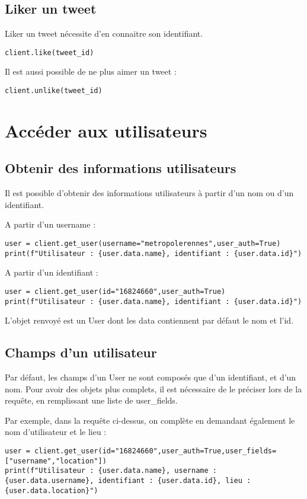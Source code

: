 \documentclass[11pt,a4paper]{article}
\begin{document}
\subsection{Liker un tweet}
Liker un tweet nécessite d'en connaitre son identifiant. 
\begin{lstlisting}
client.like(tweet_id)
\end{lstlisting}

Il est aussi possible de ne plus aimer un tweet : 
\begin{lstlisting}
client.unlike(tweet_id)
\end{lstlisting}
\section{Accéder aux utilisateurs}

\subsection{Obtenir des informations utilisateurs}

Il est possible d'obtenir des informations utilisateurs à partir d'un nom ou d'un identifiant.



A partir d'un username : 
\begin{lstlisting}
user = client.get_user(username="metropolerennes",user_auth=True)
print(f"Utilisateur : {user.data.name}, identifiant : {user.data.id}")
\end{lstlisting}

A partir d'un identifiant : 

\begin{lstlisting}
user = client.get_user(id="16824660",user_auth=True)
print(f"Utilisateur : {user.data.name}, identifiant : {user.data.id}")
\end{lstlisting}

L'objet renvoyé est un User dont les data contiennent par défaut le nom et l'id.

\subsection{Champs d'un utilisateur}
Par défaut, les champs d'un User ne sont composés que d'un identifiant, et d'un nom. Pour avoir des objets plus complets, il est nécessaire de le préciser lors de la requête, en remplissant une liste de user\_fields.

Par exemple, dans la requête ci-dessus, on complète en demandant également le nom d'utilisateur et le lieu : 
\begin{lstlisting}
user = client.get_user(id="16824660",user_auth=True,user_fields=["username","location"])
print(f"Utilisateur : {user.data.name}, username :{user.data.username}, identifiant : {user.data.id}, lieu : {user.data.location}")
\end{lstlisting}
\end{document}
